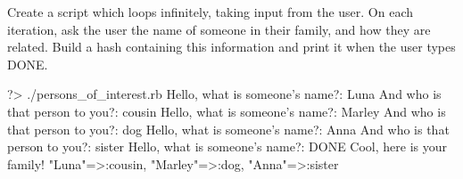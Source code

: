 \documentclass{42-en}
\begin{document}
Create a script which loops infinitely, taking input from the user. On each iteration, ask the user the name of someone in their family, and how they are related. Build a hash containing this information and print it when the user types DONE.

\begin{42console}
	?> ./persons_of_interest.rb
	Hello, what is someone's name?: Luna
	And who is that person to you?: cousin
	Hello, what is someone's name?: Marley
	And who is that person to you?: dog
	Hello, what is someone's name?: Anna
	And who is that person to you?: sister
	Hello, what is someone's name?: DONE
	Cool, here is your family!
	{"Luna"=>:cousin, "Marley"=>:dog, "Anna"=>:sister}
\end{42console}


\end{document}
